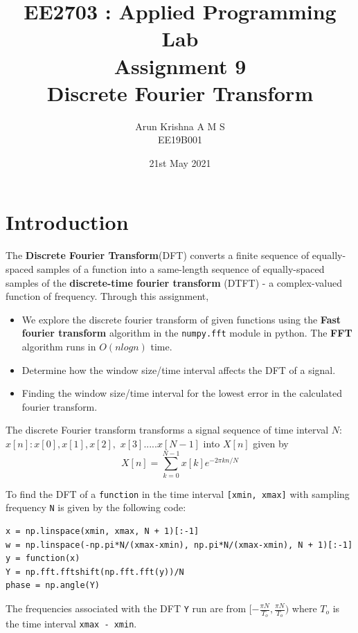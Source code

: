 \documentclass[12pt, a4paper]{report}
\title{\textbf{EE2703 : Applied Programming Lab \\ Assignment 9 \\ Discrete Fourier Transform}} %
\author{Arun Krishna A M S \\ EE19B001} %
\date{21st May 2021} %
\begin{document}
		
		
\maketitle %
\justifying

\section*{Introduction}
The \textbf{Discrete Fourier Transform}(DFT) converts a finite sequence of equally-spaced samples of a function into a same-length sequence of equally-spaced samples of the \textbf{discrete-time fourier transform} (DTFT) - a complex-valued function of frequency. Through this assignment, 
\begin{itemize}
  	\item We explore the discrete fourier transform of given functions using the \textbf{Fast fourier transform} algorithm in the \texttt{numpy.fft} module in python. The \textbf{FFT} algorithm runs in $O(nlogn)$ time.
    \item Determine how the window size/time interval affects the DFT of a signal. 
  	\item Finding the window size/time interval for the lowest error in the calculated fourier transform.
\end{itemize}
The discrete Fourier transform transforms a signal sequence of time interval $N$: $x[n]: x[0], x[1], x[2],$ $x[3].....  x[N-1]$ into $X[n]$ given by
\begin{equation}
X[n] = \sum_{k=0}^{N-1} x[k] e^{-2\pi kn/N}
\end{equation}

To find the DFT of a \texttt{function} in the time interval \texttt{[xmin, xmax]} with sampling frequency \texttt{N} is given by the following code:
\begin{verbatim}
x = np.linspace(xmin, xmax, N + 1)[:-1]
w = np.linspace(-np.pi*N/(xmax-xmin), np.pi*N/(xmax-xmin), N + 1)[:-1]
y = function(x)
Y = np.fft.fftshift(np.fft.fft(y))/N    
phase = np.angle(Y)
\end{verbatim}
The frequencies associated with the DFT \texttt{Y} run are from $[-\frac{\pi N}{T_o},\frac{\pi N}{T_o})$ where $T_o$ is the time interval \texttt{xmax - xmin}. 
\end{document}
